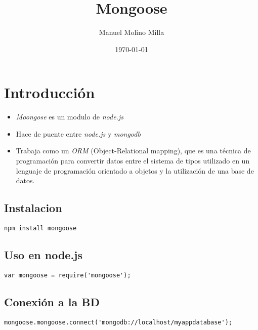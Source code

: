 \documentclass[4paper]{article}
\author{Manuel Molino Milla}
\title{\textbf{Mongoose}}
\date{\today}
\begin{document}
\maketitle 
\tableofcontents
\newpage

\section{Introducción}

\begin{itemize}
\item \emph{Moongose} es un modulo de \emph{node.js} 
\item Hace de puente entre \emph{node.js} y \emph{mongodb}
\item Trabaja como un \emph{ORM} (Object-Relational mapping), que es una técnica de programación para convertir datos entre el sistema de tipos utilizado en un lenguaje de programación orientado a objetos y la utilización de una base de datos.
\end{itemize}

\subsection{Instalacion}
\begin{lstlisting}
npm install mongoose
\end{lstlisting}

\subsection{Uso en node.js}
\begin{lstlisting}
var mongoose = require('mongoose');
\end{lstlisting}

\subsection{Conexión a la BD}
\begin{lstlisting}
mongoose.mongoose.connect('mongodb://localhost/myappdatabase');
\end{lstlisting}
\end{document}
